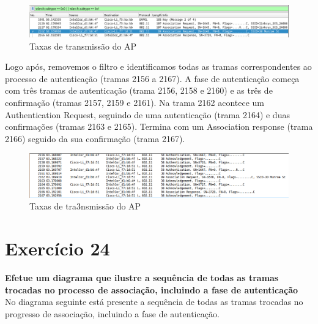 \documentclass[a4paper]{report}
\begin{document}
\begin{figure}[H]
    \centering 
    \includegraphics[width=\textwidth]{images/filterEx23.png}  
    \caption{Taxas de transmissão do AP}
    \label{fig:filterEx23}
\end{figure}
Logo após, removemos o filtro e identificamos todas as tramas correspondentes ao processo 
de autenticação (tramas 2156 a 2167). A fase de autenticação começa com três
tramas de autenticação (trama 2156, 2158 e 2160) e as três de confirmação
(tramas 2157, 2159 e 2161). Na trama 2162 acontece um Authentication Request,
seguindo de uma autenticação (trama 2164) e duas confirmações (tramas 2163 e
2165). Termina com um Association response (trama 2166) seguido da sua
confirmação (trama 2167).

\begin{figure}[H]
    \centering 
    \includegraphics[width=\textwidth]{images/nofilterEx23.png}  
    \caption{Taxas de tra3nsmissão do AP}
    \label{fig:nofilterEx23}
\end{figure}

\section{Exercício 24}
\textbf{Efetue um diagrama que ilustre a sequência de todas as tramas trocadas
no processo de associação, incluindo a fase de autenticação}\\
No diagrama seguinte está presente a sequência de todas as tramas trocadas no
progresso de associação, incluindo a fase de autenticação.
\end{document}
